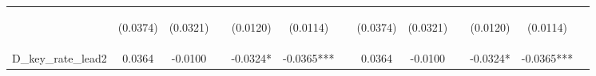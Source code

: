 \documentclass[]{article}
\begin{document}
\begin{center}
\begin{tabular}{lcccccccccccc}
\vspace{4pt} & \begin{footnotesize}(0.0374)\end{footnotesize} & \begin{footnotesize}(0.0321)\end{footnotesize} & \begin{footnotesize}\end{footnotesize} & \begin{footnotesize}(0.0120)\end{footnotesize} & \begin{footnotesize}(0.0114)\end{footnotesize} & \begin{footnotesize}\end{footnotesize} & \begin{footnotesize}(0.0374)\end{footnotesize} & \begin{footnotesize}(0.0321)\end{footnotesize} & \begin{footnotesize}\end{footnotesize} & \begin{footnotesize}(0.0120)\end{footnotesize} & \begin{footnotesize}(0.0114)\end{footnotesize} & \begin{footnotesize}\end{footnotesize} \\
D\_key\_rate\_lead2 & 0.0364 & -0.0100 &  & -0.0324* & -0.0365*** &  & 0.0364 & -0.0100 &  & -0.0324* & -0.0365*** &  \\

\end{tabular}
\end{center}
\end{document}
